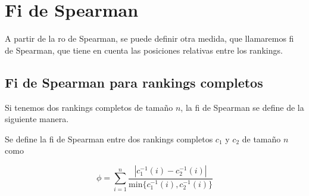 \section{Fi de Spearman}

A partir de la ro de Spearman, se puede definir otra medida, que llamaremos fi de Spearman, que tiene en cuenta las posiciones relativas entre los rankings.

\subsection{Fi de Spearman para rankings completos}

Si tenemos dos rankings completos de tamaño $n$, la fi de Spearman se define de la siguiente manera.

\begin{defi}
Se define la fi de Spearman entre dos rankings completos $c_1$ y $c_2$ de tamaño $n$ como 

\begin{equation}
\phi = \sum\limits_{i=1}^{n} \dfrac{|c_1^{-1}(i) - c_2^{-1}(i)|}{\mathrm{min}\{c_1^{-1}(i), c_2^{-1}(i)\}}
\end{equation}
\end{defi}

